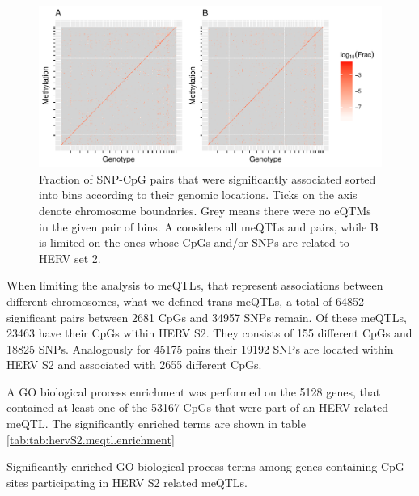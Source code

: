 \documentclass[a4paper,12pt,twoside,openright]{report}
\begin{document}
\begin{figure}[tb]
	\includegraphics[scale = 1, keepaspectratio = true]{../figures/meqtl_all_herv_heatmap}  
	\caption{Fraction of SNP-CpG pairs that were significantly associated sorted into bins according to their genomic locations. Ticks on the axis denote chromosome boundaries. Grey means there were no eQTMs in the given pair of bins. A considers all meQTLs and pairs, while B is limited on the ones whose CpGs and/or SNPs are related to HERV set 2.}
    \label{fig:global.meqtl.heatmap}
\end{figure}

When limiting the analysis to meQTLs, that represent associations between different chromosomes, what we defined trans-meQTLs, a total of 64852 significant pairs between 2681 CpGs and 34957 SNPs remain. Of these meQTLs, 23463 have their CpGs within HERV S2. They consists of 155 different CpGs and 18825 SNPs. Analogously for 45175 pairs their 19192 SNPs are located within HERV S2 and associated with 2655 different CpGs.

A GO biological process enrichment was performed on the 5128 genes, that contained at least one of the 53167 CpGs that were part of an HERV related meQTL. The significantly enriched terms are shown in table \ref{tab:tab:hervS2.meqtl.enrichment}

\begin{table}[h!]
  \begin{center}
  \end{center}        
	\caption{Significantly enriched GO biological process terms among genes containing CpG-sites participating in HERV S2 related meQTLs.}
	\label{tab:hervS2.meqtl.enrichment}
\end{table}
\end{document}
